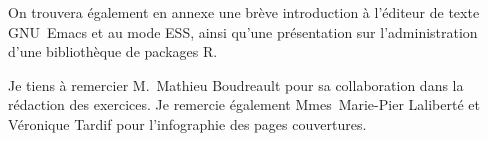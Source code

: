 On trouvera également en annexe une brève introduction à l'éditeur de
texte GNU~Emacs et au mode ESS, ainsi qu'une présentation sur
l'administration d'une bibliothèque de packages R.

Je tiens à remercier M.~Mathieu Boudreault pour sa collaboration dans
la rédaction des exercices. Je remercie également Mmes~Marie-Pier
Laliberté et Véronique Tardif pour l'infographie des pages
couvertures.

